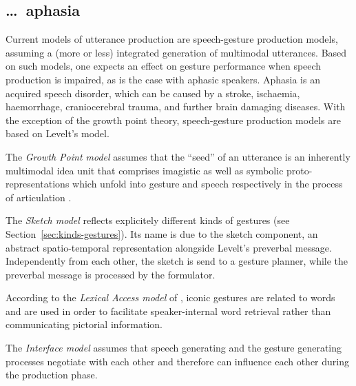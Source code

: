 \documentclass[output=paper]{langsci/langscibook}
\begin{document}
\subsection{\ldots\ aphasia}
\label{sec:aphasia}

Current models of utterance production are speech-gesture production models, assuming a (more or less) integrated generation of multimodal utterances.
%
Based on such models, one expects an effect on gesture performance when speech production is impaired, as is the case with aphasic speakers. 
%
Aphasia  is an acquired speech disorder, which can be caused by a stroke, ischaemia, haemorrhage, craniocerebral trauma, and further brain damaging diseases.
%
With the exception of the growth point theory, speech-gesture production models are based on Levelt's \citeyear{Levelt:1989}  model.

The \emph{Growth Point model} \citep{McNeill:Duncan:2000} assumes that the \enquote{seed} of an utterance is an inherently multimodal idea unit that comprises imagistic as well as symbolic proto-representations which unfold into gesture and speech respectively in the process of articulation \citetext{see also \citealt{Roepke:2011} on the growth point's entrechment in contexts and frames}.

The \emph{Sketch model}  \citep{de:Ruiter:2000} reflects explicitely different kinds of gestures (see Section~\ref{sec:kinds-gestures}). 
%
Its name is due to the sketch component, an abstract spatio-temporal representation alongside Levelt's preverbal message. 
%
Independently from each other, the sketch is send to a gesture planner, while the preverbal message is processed by the formulator.

According to the \emph{Lexical Access model}  of \citet{Krauss:Chen:Gottesmann:2000}, iconic gestures are related to words and are used in order to facilitate speaker-internal word retrieval rather than communicating pictorial information.

The \emph{Interface model}  \citep{Kita:Ozyurek:2003} assumes that speech generating and the gesture generating processes negotiate with each other and therefore can influence each other during the production phase.
\end{document}
